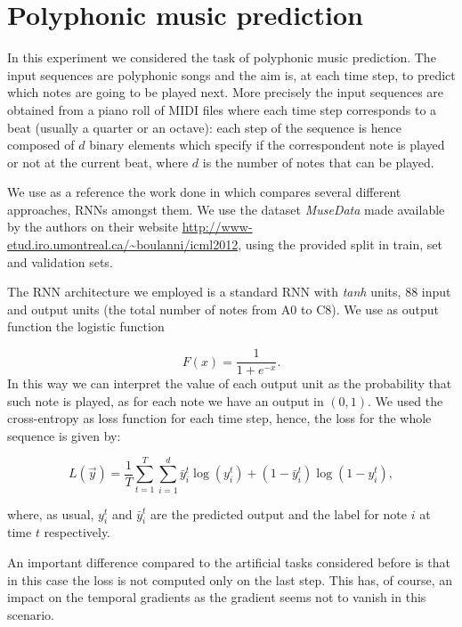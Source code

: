  
\section{Polyphonic music prediction}

In this experiment we considered the task of polyphonic music prediction. The input sequences are polyphonic songs and the aim is, at each time step, to predict which notes are going to be played next. More precisely the input sequences are obtained from a piano roll of MIDI files where each time step corresponds to a beat (usually a quarter or an octave): each step of the sequence is hence composed of $d$ binary elements which specify if the correspondent note is played or not at the current beat, where $d$ is the number of notes that can be played.

We use as a reference the work done in \cite{BoulangerMuse} which compares several different approaches, RNNs amongst them. We use the dataset \textsl{MuseData} made available by the authors on their website
\url{http://www-etud.iro.umontreal.ca/~boulanni/icml2012}, using the provided split in train, set and validation sets.

The RNN architecture we employed is a standard RNN with \textit{tanh} units, 88 input and output units (the total number of notes from A0 to C8). We use as output function the logistic function

\begin{equation}
	F(x)=\frac{1}{1+e^{-x}}.
\end{equation}
In this way we can interpret the value of each output unit as the probability that such note is played, as for each note we have an output in $(0,1)$. We used the cross-entropy as loss function for each time step, hence, the loss for the whole sequence is given by:

\begin{equation}
	L(\vec{y}) = \frac{1}{T}\sum_{t=1}^{T}\sum_{i=1}^{d} \bar{y}_i^t \log(y_i^t) + (1-\bar{y}_i^t)\log(1-y_i^t),
\end{equation}

where, as usual, $y_i^t$ and $\bar{y}_i^t$ are the predicted output and the label for note $i$ at time $t$ respectively.

An important difference compared to the artificial tasks considered before is that in this case the loss is not computed only on the last step. This has, of course, an impact on the temporal gradients as the gradient seems not to vanish in this scenario. 

